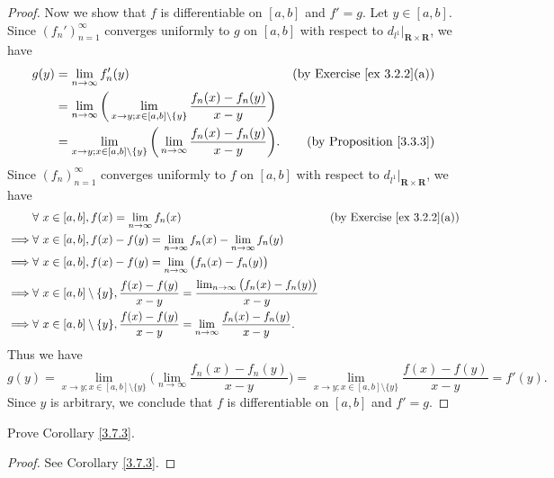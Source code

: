 \begin{proof}
    Now we show that \(f\) is differentiable on \([a, b]\) and \(f' = g\).
    Let \(y \in [a, b]\).
    Since \((f_n')_{n = 1}^\infty\) converges uniformly to \(g\) on \([a, b]\) with respect to \(d_{l^1}|_{\mathbf{R} \times \mathbf{R}}\), we have
    \begin{align*}
        g(y) & = \lim_{n \to \infty} f_n'(y)                                                                                  & \text{(by Exercise \ref{ex 3.2.2}(a))} \\
             & = \lim_{n \to \infty} \bigg(\lim_{x \to y ; x \in [a, b] \setminus \{y\}} \frac{f_n(x) - f_n(y)}{x - y}\bigg)                                           \\
             & = \lim_{x \to y ; x \in [a, b] \setminus \{y\}} \bigg(\lim_{n \to \infty} \frac{f_n(x) - f_n(y)}{x - y}\bigg). & \text{(by Proposition \ref{3.3.3})}
    \end{align*}
    Since \((f_n)_{n = 1}^\infty\) converges uniformly to \(f\) on \([a, b]\) with respect to \(d_{l^1}|_{\mathbf{R} \times \mathbf{R}}\), we have
    \begin{align*}
                 & \forall\ x \in [a, b], f(x) = \lim_{n \to \infty} f_n(x)                                                                       & \text{(by Exercise \ref{ex 3.2.2}(a))} \\
        \implies & \forall\ x \in [a, b], f(x) - f(y) = \lim_{n \to \infty} f_n(x) - \lim_{n \to \infty} f_n(y)                                                                            \\
        \implies & \forall\ x \in [a, b], f(x) - f(y) = \lim_{n \to \infty} \big(f_n(x) - f_n(y)\big)                                                                                      \\
        \implies & \forall\ x \in [a, b] \setminus \{y\}, \frac{f(x) - f(y)}{x - y} = \frac{\lim_{n \to \infty} \big(f_n(x) - f_n(y)\big)}{x - y}                                          \\
        \implies & \forall\ x \in [a, b] \setminus \{y\}, \frac{f(x) - f(y)}{x - y} = \lim_{n \to \infty} \frac{f_n(x) - f_n(y)}{x - y}.
    \end{align*}
    Thus we have
    \[
        g(y) = \lim_{x \to y ; x \in [a, b] \setminus \{y\}} \bigg(\lim_{n \to \infty} \frac{f_n(x) - f_n(y)}{x - y}\bigg) = \lim_{x \to y ; x \in [a, b] \setminus \{y\}} \frac{f(x) - f(y)}{x - y} = f'(y).
    \]
    Since \(y\) is arbitrary, we conclude that \(f\) is differentiable on \([a, b]\) and \(f' = g\).
\end{proof}

\begin{exercise}\label{ex 3.7.3}
    Prove Corollary \ref{3.7.3}.
\end{exercise}

\begin{proof}
    See Corollary \ref{3.7.3}.
\end{proof}
